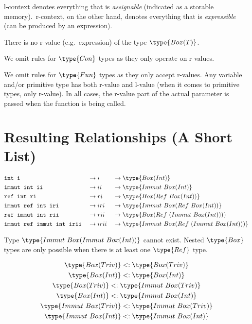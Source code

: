 \documentclass{article}
\newcommand\subtype{\mathrel{<:}}
\newcommand{\syntax}{\texttt}
\begin{document}
\medskip

l-context denotes everything that is \textit{assignable} (indicated as a
storable memory).\ r-context, on the other hand, denotes everything that is
\textit{expressible} (can be produced by an expression).

\medskip

There is no r-value (e.g.\ expression) of the type $\type{Box(T)}$.

\medskip

We omit rules for $\type{Con}$ types as they only operate on r-values.

\medskip

We omit rules for $\type{Fun}$ types as they only accept r-values.
Any variable and/or primitive type has both r-value and l-value (when it comes
to primitive types, only r-value). In all cases, the r-value part of the actual
parameter is passed when the function is being called.


\section*{Resulting Relationships (A Short List)}

\begin{align*}
  &\syntax{int i}                    &&\to i    &&\to \type{Box(Int)}\\
  &\syntax{immut int ii}             &&\to ii   &&\to \type{Immut\ Box(Int)}\\
  &\syntax{ref int ri}               &&\to ri   &&\to \type{Box(Ref\ Box(Int))}\\
  &\syntax{immut ref int iri}        &&\to iri  &&\to \type{Immut\ Box(Ref\ Box(Int))}\\
  &\syntax{ref immut int rii}        &&\to rii  &&\to \type{Box(Ref\ (Immut\ Box(Int)))}\\
  &\syntax{immut ref immut int irii} &&\to irii &&\to \type{Immut\ Box(Ref\ (Immut\ Box(Int)))}
\end{align*}

\medskip

Type $\type{Immut\ Box(Immut\ Box(Int))}$ cannot exist. Nested $\type{Box}$
types are only possible when there is at least one $\type{Ref}$ type.

\begin{gather*}
  \type{Box(Triv)}        \subtype \type{Box(Triv)}\\
  \type{Box(Int)}         \subtype \type{Box(Int)}\\
  \type{Box(Triv)}        \subtype \type{Immut\ Box(Triv)}\\
  \type{Box(Int)}         \subtype \type{Immut\ Box(Int)}\\
  \type{Immut\ Box(Triv)} \subtype \type{Immut\ Box(Triv)}\\
  \type{Immut\ Box(Int)}  \subtype \type{Immut\ Box(Int)}
\end{gather*}
\end{document}
